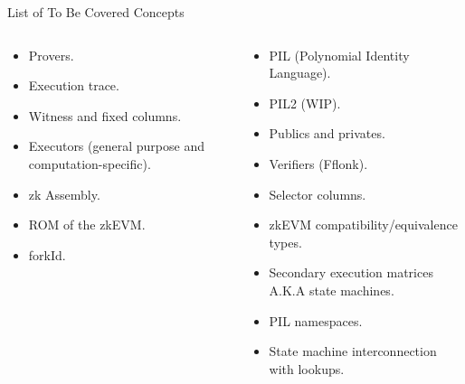 \begin{frame}{List of To Be Covered Concepts}
\begin{columns}
\begin{column}{0.48\textwidth}
\begin{itemize}
\item Provers. \hfill \Square
\item Execution trace. \hfill \Square
\item Witness and fixed columns. \hfill \Square
\item Executors (general purpose and computation-specific). \hfill \Square
\item zk Assembly. \hfill \Square
\item ROM of the zkEVM. \hfill \Square
\item forkId. \hfill \Square
\end{itemize}
\end{column}
\begin{column}{0.48\textwidth}
\begin{itemize}
\item PIL (Polynomial Identity Language). \hfill \Square
\item PIL2 (WIP). \hfill \Square
\item Publics and privates. \hfill \Square
\item Verifiers (Fflonk). \hfill \Square
\item Selector columns. \hfill \Square
\item zkEVM compatibility/equivalence types. \hfill \Square
\item Secondary execution matrices A.K.A state machines. \hfill \Square
\item PIL namespaces. \hfill \Square
\item State machine interconnection with lookups. \hfill \Square
\end{itemize}
\end{column}
\end{columns}
\end{frame}
\fi



